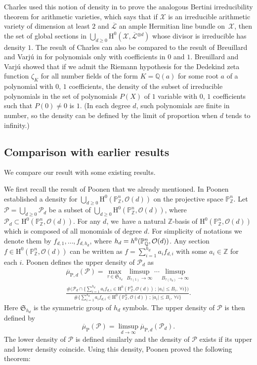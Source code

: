 \documentclass[JEP,XML,SOM,Unicode,published]{cedram}
\newcommand{\sep}{\,;\,}
\theoremstyle{plain}
\theoremstyle{definition}
\newcommand{\ho}{\mathrm{H}}
\newcommand{\X}{\mathcal{X}}
\newcommand{\Li}{\overline{\mathcal{L}}{}}
\newcommand{\Q}{\mathbb{Q}}
\newcommand{\Z}{\mathbb{Z}}
\newcommand{\pr}{\mathbb{P}}
\begin{document}
Charles used this notion of density in \cite{Ch17} to prove the analogous Bertini irreducibility theorem for arithmetic varieties, which says that if $\X$ is an irreducible arithmetic variety of dimension at least $2$ and $\Li$ an ample Hermitian line bundle on~$\X$, then the set of global sections in $\bigcup_{d\geq 0}\ho^0(\X, \Li^{\otimes d})$ whose divisor is irreducible has density $1$.
The result of Charles can also be compared to the result of Breuillard and Varjú in \cite{BV19} for polynomials only with coefficients in $0$ and $1$. Breuillard and Varjú showed that if we admit the Riemann hypothesis for the Dedekind zeta function $\zeta_K$ for all number fields of the form $K=\Q(a)$ for some root $a$ of a polynomial with $0$, $1$ coefficients, the density of the subset of irreducible polynomials in the set of polynomials $P(X)$ of $1$ variable with $0$, $1$ coefficients such that $P(0)\not=0$ is $1$. (In each degree $d$, such polynomials are finite in number, so the density can be defined by the limit of proportion when $d$ tends to infinity.) 

\subsection{Comparison with earlier results}
We compare our result with some existing results.

We first recall the result of Poonen that we already mentioned. In \cite{Po04} Poonen established a density for $\bigcup_{d\geq 0}\ho^0(\pr^n_{\Z}, \mathcal{O}(d))$ on the projective space $\pr^n_{\Z}$. Let $\mathcal{P}=\bigcup_{d\geq 0}\mathcal{P}_d$ be a subset of $\bigcup_{d\geq 0}\ho^0(\pr^n_{\Z}, \mathcal{O}(d))$, where $\mathcal{P}_d\subset \ho^0(\pr^n_{\Z}, \mathcal{O}(d))$. For any $d$, we~have a natural $\Z$-basis of $\ho^0(\pr^n_{\Z}, \mathcal{O}(d))$ which is composed of all monomials of degree $d$. For simplicity of notations we denote them by $f_{d,1},\dots, f_{d,h_d}$, where $h_d=\nobreak h^0(\pr^n_{\Q}, \mathcal{O}(d))$. Any section $f\in \ho^0(\pr^n_{\Z}, \mathcal{O}(d))$ can be written as $f=\sum_{i=1}^{h_d}a_if_{d,i}$ with some $a_i\in \Z$ for each $i$. Poonen defines the upper density of $\mathcal{P}_d$ as
\begin{multline*}
\overline{\mu}_{\mathrm{P},d}(\mathcal{P})=\max_{\tau\in \mathfrak{S}_{h_d}}\limsup_{B_{\tau(1)}\to \infty}\cdots \limsup_{B_{\tau(h_d)}\to \infty}\\
\frac{\#\bigl(\mathcal{P}_d\cap \{ \sum_{i=1}^{h_d}a_if_{d,i}\in \ho^0(\pr^n_{\Z}, \mathcal{O}(d))\sep |a_i|\leq B_i,\ \forall i \}\bigr)}{\#\{ \sum_{i=1}^{h_d}a_if_{d,i}\in \ho^0(\pr^n_{\Z}, \mathcal{O}(d))\sep |a_i|\leq B_i,\ \forall i \}}.
\end{multline*}
Here $\mathfrak{S}_{h_d}$ is the symmetric group of $h_d$ symbols. The upper density of $\mathcal{P}$ is then defined by
\[
\overline{\mu}_{\mathrm{P}}(\mathcal{P})=\limsup_{d\to \infty} \overline{\mu}_{\mathrm{P},d}(\mathcal{P}_d).
\]
The lower density of $\mathcal{P}$ is defined similarly and the density of $\mathcal{P}$ exists if its upper and lower density coincide. Using this density, Poonen proved the following theorem:
\end{document}
